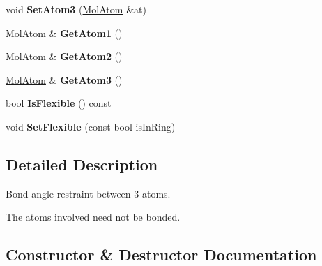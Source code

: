 \begin{DoxyCompactItemize}
void {\bfseries Set\+Atom3} (\mbox{\hyperlink{class_obj_cryst_1_1_mol_atom}{Mol\+Atom}} \&at)
\item 
\mbox{\label{class_obj_cryst_1_1_mol_bond_angle_a5987a6123fe22b9be36e279d930042b7}} 
\mbox{\hyperlink{class_obj_cryst_1_1_mol_atom}{Mol\+Atom}} \& {\bfseries Get\+Atom1} ()
\item 
\mbox{\label{class_obj_cryst_1_1_mol_bond_angle_aa65a60cb6ebd2a53d6b5c18a785c7b75}} 
\mbox{\hyperlink{class_obj_cryst_1_1_mol_atom}{Mol\+Atom}} \& {\bfseries Get\+Atom2} ()
\item 
\mbox{\label{class_obj_cryst_1_1_mol_bond_angle_a296b44dd458b76e397a68e356380987f}} 
\mbox{\hyperlink{class_obj_cryst_1_1_mol_atom}{Mol\+Atom}} \& {\bfseries Get\+Atom3} ()
\item 
\mbox{\label{class_obj_cryst_1_1_mol_bond_angle_ad65d038da594897a1ee72c0cefb420ab}} 
bool {\bfseries Is\+Flexible} () const
\item 
\mbox{\label{class_obj_cryst_1_1_mol_bond_angle_a3a55a61f62453bf6ee6b5b6783a577c1}} 
void {\bfseries Set\+Flexible} (const bool is\+In\+Ring)
\end{DoxyCompactItemize}


\subsection{Detailed Description}
Bond angle restraint between 3 atoms.

The atoms involved need not be bonded. 

\subsection{Constructor \& Destructor Documentation}
\mbox{\label{class_obj_cryst_1_1_mol_bond_angle_a3707f7b1b608c105ba7ee98cab7a87ed}} 

